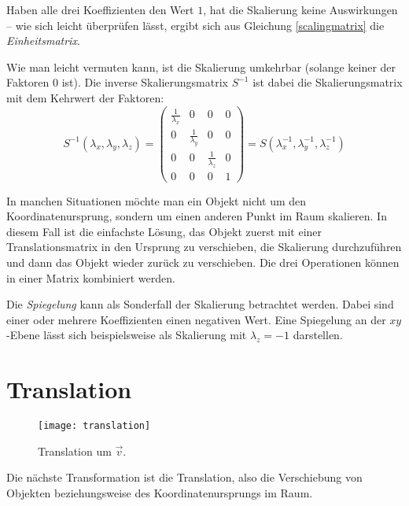 Haben alle drei Koeffizienten den Wert $1$, hat die Skalierung keine Auswirkungen -- wie sich leicht überprüfen lässt, ergibt sich aus Gleichung \ref{scalingmatrix} die \emph{Einheitsmatrix}.

Wie man leicht vermuten kann, ist die Skalierung umkehrbar (solange keiner der Faktoren 0 ist). Die inverse Skalierungsmatrix $S^{-1}$ ist dabei die Skalierungsmatrix mit dem Kehrwert der Faktoren:
\begin{equation}
 S^{-1}{(\lambda_x, \lambda_y, \lambda_z)} =
 \begin{pmatrix}
  \frac{1}{\lambda_x} & 0 & 0 & 0 \\
  0 & \frac{1}{\lambda_y} & 0 & 0 \\
  0 & 0 & \frac{1}{\lambda_z} & 0 \\
  0 & 0 & 0 & 1
 \end{pmatrix}
 = S{(\lambda_x^{-1}, \lambda_y^{-1}, \lambda_z^{-1})}
\end{equation}


In manchen Situationen möchte man ein Objekt nicht um den Koordinatenursprung, sondern um einen anderen Punkt im Raum skalieren. In diesem Fall ist die einfachste Lösung, das Objekt zuerst mit einer Translationsmatrix in den Ursprung zu verschieben, die Skalierung durchzuführen und dann das Objekt wieder zurück zu verschieben. Die drei Operationen können in einer Matrix kombiniert werden.


Die \emph{Spiegelung} kann als Sonderfall der Skalierung betrachtet werden. Dabei sind einer oder mehrere Koeffizienten einen negativen Wert. Eine Spiegelung an der $xy$-Ebene lässt sich beispielsweise als Skalierung mit $\lambda_z = -1$ darstellen.

\section{Translation}
\label{translation}

\begin{wrapfigure}{R}{0.5\textwidth}
  \texttt{[image: translation]}
  \vspace{-15pt}
  \caption{Translation um $\vec v$.}
\end{wrapfigure}

Die nächste Transformation ist die Translation, also die Verschiebung von Objekten beziehungsweise des Koordinatenursprungs im Raum.

